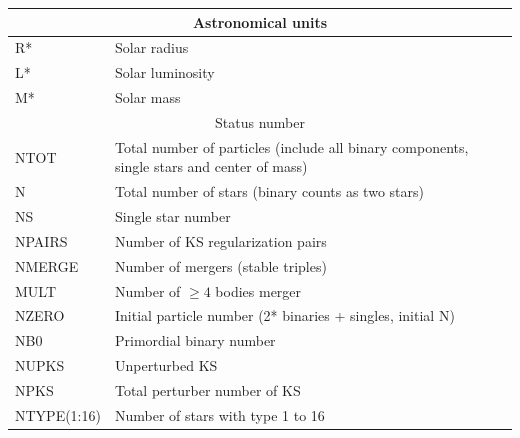 \begin{longtable}{|p{0.7in}|p{4.3in}|}
    \multicolumn{2}{|c|}{ Astronomical units } \\\hline
    R*    & Solar radius \\\hline
    L*    & Solar luminosity \\\hline
    M*    & Solar mass \\\hline
    \hline

    \multicolumn{2}{|c|}{ Status number} \\\hline
    NTOT   & Total number of particles (include all binary components, single stars and center of mass) \\\hline
    N      & Total number of stars (binary counts as two stars) \\\hline
    NS     & Single star number \\\hline
    NPAIRS & Number of KS regularization pairs\\\hline
    NMERGE & Number of mergers (stable triples) \\\hline
    MULT   & Number of $\ge 4$ bodies merger \\\hline
    NZERO  & Initial particle number (2* binaries + singles, initial N)\\\hline
    NB0    & Primordial binary number \\\hline
    NUPKS  & Unperturbed KS \\\hline
    NPKS   & Total perturber number of KS \\\hline
    NTYPE(1:16) & Number of stars with type 1 to 16 \\\hline
    \hline


\end{longtable}
